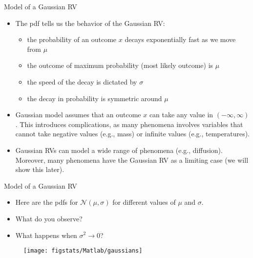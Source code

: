\documentclass[9pt]{beamer}
\begin{document}
%
\begin{frame}{Model of a Gaussian RV}


\begin{itemize}
\item The pdf tells us the behavior of the Gaussian RV: 
\begin{itemize}
\item the probability of an outcome $x$ decays exponentially fast as we move from $\mu$
\item the outcome of maximum probability (most likely outcome) is $\mu$
\item the speed of the decay is dictated by $\sigma$
\item the decay in probability is symmetric around $\mu$
\end{itemize}

\item Gaussian model assumes that an outcome $x$ can take any value in $(-\infty,\infty)$. This introduces complications, as many phenomena involves variables that cannot take negative values (e.g., mass) or infinite values (e.g., temperatures).   

\item Gaussian RVs can model a wide range of phenomena (e.g., diffusion). Moreover, many phenomena have the Gaussian RV as a limiting case (we will show this later). 
\end{itemize}

\end{frame}

%
\begin{frame}{Model of a Gaussian RV}
\begin{itemize}
\item Here are the pdfs for $\mathcal{N}(\mu,\sigma)$ for different values of $\mu$ and $\sigma$.
\item What do you observe?
\item What happens when $\sigma^2\to 0$?
\end{itemize}
\begin{figure}[!htb]
    \centering
	\texttt{[image: figstats/Matlab/gaussians]}
\end{figure}
\end{frame}
\end{document}
